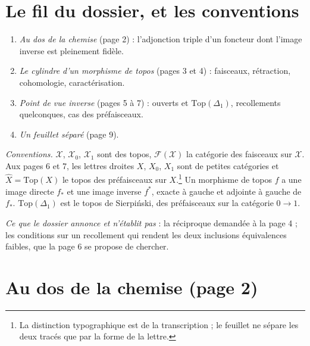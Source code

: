 \documentclass[11pt,a4paper]{article}
\begin{document}
\section*{Le fil du dossier, et les conventions}

\begin{enumerate}
\item[1.] \emph{Au dos de la chemise} (page 2) : l'adjonction triple d'un
foncteur dont l'image inverse est pleinement fidèle.
\item[2.] \emph{Le cylindre d'un morphisme de topos} (pages 3 et 4) :
faisceaux, rétraction, cohomologie, caractérisation.
\item[3.] \emph{Point de vue inverse} (pages 5 à 7) : ouverts et
$\mathrm{Top}(\Delta_{1})$, recollements quelconques, cas des préfaisceaux.
\item[4.] \emph{Un feuillet séparé} (page 9).
\end{enumerate}

\emph{Conventions.} $\mathcal{X}$, $\mathcal{X}_{0}$, $\mathcal{X}_{1}$ sont des
topos, $\mathcal{F}(\mathcal{X})$ la catégorie des faisceaux sur $\mathcal{X}$.
Aux pages 6 et 7, les lettres droites $X$, $X_{0}$, $X_{1}$ sont de petites
catégories et $\widehat{X} = \mathrm{Top}(X)$ le topos des préfaisceaux sur
$X$.\footnote{La distinction typographique est de la transcription ; le
feuillet ne sépare les deux tracés que par la forme de la lettre.} Un
morphisme de topos $f$ a une image directe $f_{*}$ et une image inverse
$f^{*}$, exacte à gauche et adjointe à gauche de $f_{*}$.
$\mathrm{Top}(\Delta_{1})$ est le topos de Sierpiński, des préfaisceaux sur la
catégorie $0 \to 1$.

\emph{Ce que le dossier annonce et n'établit pas} : la réciproque demandée à la
page 4 ; les conditions sur un recollement qui rendent les deux inclusions
équivalences faibles, que la page 6 se propose de chercher.

\section*{Au dos de la chemise (page 2)}
\end{document}
